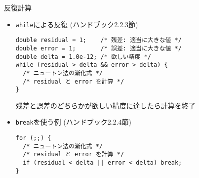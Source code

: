 \begin{frame}[t,fragile]{反復計算}
  \begin{itemize}
  \item {\tt while}による反復 (ハンドブック2.2.3節)
\begin{lstlisting}
double residual = 1;    /* 残差: 適当に大きな値 */
double error = 1;       /* 誤差: 適当に大きな値 */
double delta = 1.0e-12; /* 欲しい精度 */
while (residual > delta && error > delta) {
  /* ニュートン法の漸化式 */
  /* residual と error を計算 */
}
\end{lstlisting}
残差と誤差のどちらかが欲しい精度に達したら計算を終了
\item {\tt break}を使う例 (ハンドブック2.2.4節)
\begin{lstlisting}
for (;;) {
  /* ニュートン法の漸化式 */
  /* residual と error を計算 */
  if (residual < delta || error < delta) break;
}
\end{lstlisting}
  \end{itemize}
\end{frame}

